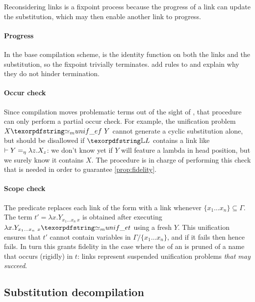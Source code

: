 Reconsidering links is a fixpoint process because the progress of a link
can update the substitution, which may then enable another link to progress.



\paragraph*{Progress}
In the base compilation scheme,  is the identity function
on both the links and the substitution, so the fixpoint trivially terminates.
 add rules to 
and explain why they do not hinder termination.

\paragraph*{Occur check}\label{sec:oc}
Since compilation moves problematic terms out of the sight of \Ue{},
that procedure can only perform a partial occur check. For example, the
unification problem $X \Ue f~Y$ cannot generate a cyclic substitution alone,
but should be disallowed if $\linkStore$ contains a link like
$ \vdash Y =_\eta \lambda z.X_z$: we don't know yet if $Y$ will feature
a lambda in head position, but we surely know it contains $X$.
The procedure  is in charge of
performing this check that is needed in order to
guarantee \cref{prop:fidelity}.

\paragraph*{Scope check}\label{sec:sc}
The predicate  
replaces each
link of the form  with
a link
 whenever $\{x_1\ldots x_n\} \subseteq \Gamma$.
The term $t' = \lambda x.Y_{{x_1\ldots x_n}~x}$ is obtained after
executing $\lambda x.Y_{{x_1\ldots x_n}~x} \Ue t$ using a fresh $Y$.
This unification
ensures that $t'$ cannot contain variables in $\Gamma / \{x_1\ldots x_n\}$,
and if it fails then \progress hence \hstep fails.
In turn this grants fidelity in the case where the \lhs of an \linketa
is pruned of a name that occurs (rigidly) in $t$:
links represent suspended unification problems
\emph{that may succeed}.


\subsection{Substitution decompilation}\label{sec:decompilation}

